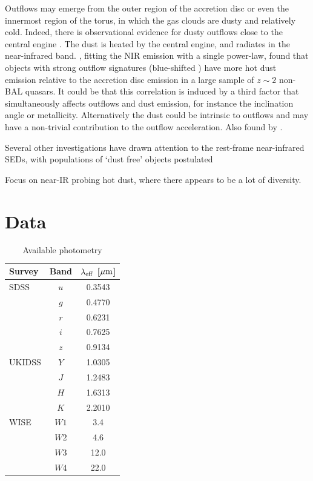 Outflows may emerge from the outer region of the accretion disc or even the innermost region of the torus, in which the gas clouds are dusty and relatively cold.  
Indeed, there is observational evidence for dusty outflows close to the central engine \citep[e.g.][]{bowler14}.
The dust is heated by the central engine, and radiates in the near-infrared band. 
\citet{wang13}, fitting the NIR emission with a single power-law, found that objects with strong outflow signatures (blue-shifted ) have more hot dust emission relative to the accretion disc emission in a large sample of $z\sim2$ non-BAL quasars. 
It could be that this correlation is induced by a third factor that simultaneously affects outflows and dust emission, for instance the inclination angle or metallicity. 
Alternatively the dust could be intrinsic to outflows and may have a non-trivial contribution to the outflow acceleration.
Also found by \citet{shen14}. 

Several other investigations have drawn attention to the rest-frame near-infrared SEDs, with populations of `dust free' objects postulated \citep{hao10,hao11,jiang10,mor11} 

Focus on near-IR probing hot dust, where there appears to be a lot of diversity. 

\section{Data}

\begin{table}
  \small
  \centering
  \begin{tabular}{l c c}
    \hline 
    Survey & Band & $\lambda_{\rm eff}$ [$\mu{\rm m}$] \\
    \hline 
    SDSS & $u$ & 0.3543 \\
         & $g$ & 0.4770 \\
         & $r$ & 0.6231 \\
         & $i$ & 0.7625 \\
         & $z$ & 0.9134 \\
    UKIDSS & $Y$ & 1.0305 \\
           & $J$ & 1.2483 \\
           & $H$ & 1.6313 \\
           & $K$ & 2.2010 \\
    WISE & $W1$ & 3.4 \\
         & $W2$ & 4.6 \\
         & $W3$ & 12.0 \\
         & $W4$ & 22.0 \\           
    \hline
  \end{tabular}
  \caption{Available photometry}
  \label{tab:photometry}
\end{table}

